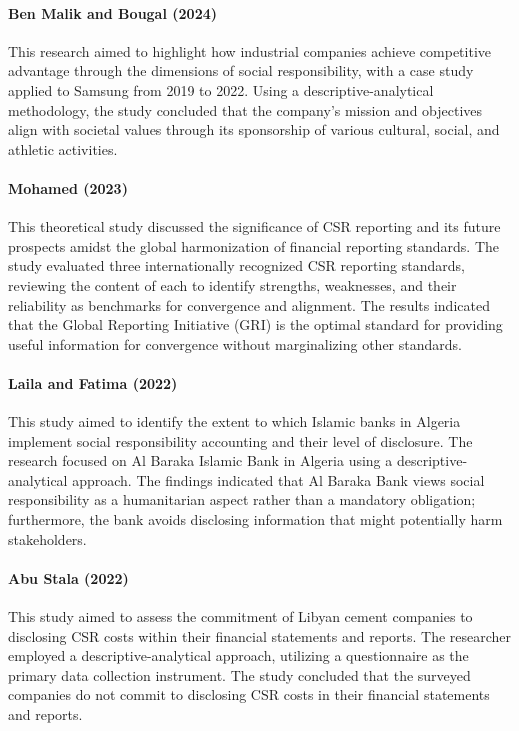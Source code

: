 \documentclass[10pt]{NSP1}
\begin{document}
\paragraph{Ben Malik and Bougal (2024) \cite{BenMalik2024}} This research aimed to highlight how industrial companies achieve competitive advantage through the dimensions of social responsibility, with a case study applied to Samsung from 2019 to 2022. Using a descriptive-analytical methodology, the study concluded that the company's mission and objectives align with societal values through its sponsorship of various cultural, social, and athletic activities.

\paragraph{Mohamed (2023) \cite{Mohamed2023}} This theoretical study discussed the significance of CSR reporting and its future prospects amidst the global harmonization of financial reporting standards. The study evaluated three internationally recognized CSR reporting standards, reviewing the content of each to identify strengths, weaknesses, and their reliability as benchmarks for convergence and alignment. The results indicated that the Global Reporting Initiative (GRI) is the optimal standard for providing useful information for convergence without marginalizing other standards.

\paragraph{Laila and Fatima (2022) \cite{Laila2022}} This study aimed to identify the extent to which Islamic banks in Algeria implement social responsibility accounting and their level of disclosure. The research focused on Al Baraka Islamic Bank in Algeria using a descriptive-analytical approach. The findings indicated that Al Baraka Bank views social responsibility as a humanitarian aspect rather than a mandatory obligation; furthermore, the bank avoids disclosing information that might potentially harm stakeholders.

\paragraph{Abu Stala (2022) \cite{AbuStala2022}} This study aimed to assess the commitment of Libyan cement companies to disclosing CSR costs within their financial statements and reports. The researcher employed a descriptive-analytical approach, utilizing a questionnaire as the primary data collection instrument. The study concluded that the surveyed companies do not commit to disclosing CSR costs in their financial statements and reports.
\end{document}
